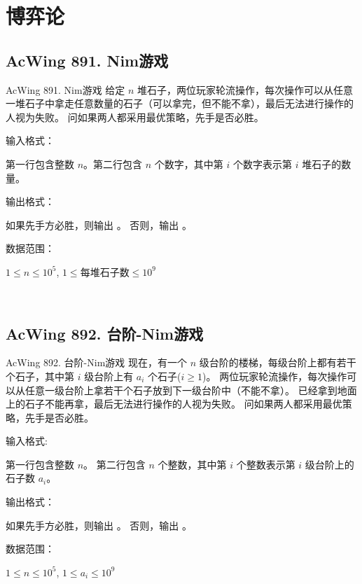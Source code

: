 \section{博弈论}

\subsection{AcWing 891. Nim游戏}
\begin{titledbox}{AcWing 891. Nim游戏}
    给定 $n$ 堆石子，两位玩家轮流操作，每次操作可以从任意一堆石子中拿走任意数量的石子（可以拿完，但不能不拿），最后无法进行操作的人视为失败。 问如果两人都采用最优策略，先手是否必胜。

    输入格式：

    第一行包含整数 $n$。第二行包含 $n$ 个数字，其中第 $i$ 个数字表示第 $i$ 堆石子的数量。

    输出格式：

    如果先手方必胜，则输出 。 否则，输出 。

    数据范围：

    $1 \le n \le 10^5$, $1 \le 每堆石子数 \le 10^9$

    \begin{inputblock}
         \\
    \end{inputblock}
    \begin{outputblock}
    \end{outputblock}
\end{titledbox}

\subsection{AcWing 892. 台阶-Nim游戏}
\begin{titledbox}{AcWing 892. 台阶-Nim游戏}
    现在，有一个 $n$ 级台阶的楼梯，每级台阶上都有若干个石子，其中第 $i$ 级台阶上有 $a_i$ 个石子($i \ge 1$)。 两位玩家轮流操作，每次操作可以从任意一级台阶上拿若干个石子放到下一级台阶中（不能不拿）。 已经拿到地面上的石子不能再拿，最后无法进行操作的人视为失败。 问如果两人都采用最优策略，先手是否必胜。

    输入格式:

    第一行包含整数 $n$。 第二行包含 $n$ 个整数，其中第 $i$ 个整数表示第 $i$ 级台阶上的石子数 $a_i$。

    输出格式：

    如果先手方必胜，则输出 。 否则，输出 。

    数据范围：

    $1 \le n \le 10^5$, $1 \le a_i \le 10^9$

    \begin{inputblock}
         \\
    \end{inputblock}
    \begin{outputblock}
    \end{outputblock}
\end{titledbox}

